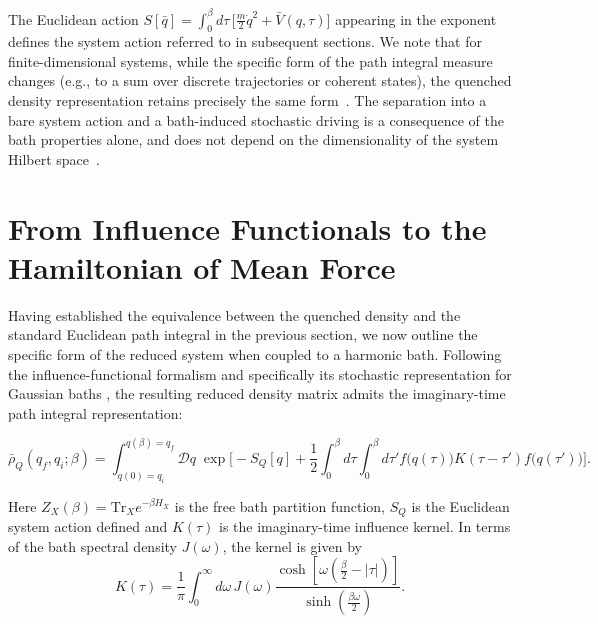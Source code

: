 \documentclass[aps,prl,twocolumn,superscriptaddress,showpacs,floatfix]{revtex4-2}
\newcommand{\Tr}{\mathrm{Tr}}
\begin{document}
The Euclidean action $S[\bar q]=\int_0^\beta d\tau\,\big[\frac{m}{2}\dot q^2+\bar V(q,\tau)\big]$
appearing in the exponent defines the system action referred to in subsequent
sections. We note that for finite-dimensional systems, while the specific form of the path integral measure changes (e.g., to a sum over discrete trajectories or coherent states), the quenched density representation retains precisely the same form~\cite{weissQuantumDissipativeSystems2012, altlandCondensedMatterField2010}. The separation into a bare system action and a bath-induced stochastic driving is a consequence of the bath properties alone, and does not depend on the dimensionality of the system Hilbert space~\cite{leggettDynamicsDissipativeTwostate1987}.
 \section{\label{sec:influence_to_hmf}From Influence Functionals to the Hamiltonian of Mean Force}
Having established the equivalence between the quenched density and the standard Euclidean path integral in the previous section, we now outline the specific form of the reduced system when coupled to a harmonic bath. Following the influence-functional formalism \cite{feynmanTheoryGeneralQuantum1963a,caldeiraQuantumTunnellingDissipative1983a,grabertQuantumBrownianMotion1988} and specifically its stochastic representation for Gaussian baths \cite{mccaulPartitionfreeApproachOpen2017c, mccaulDrivingSpinbosonModels2018a, mccaulHowWinFriends2021b}, the resulting reduced density matrix admits the imaginary-time path integral representation:
\begin{widetext}
\begin{equation}
    \bar\rho_Q(q_f,q_i;\beta) = \int_{q(0)=q_i}^{q(\beta)=q_f}\!\!\mathcal D q\; \exp\Bigg[ -S_Q[q] + \frac{1}{2}\int_0^\beta d\tau\int_0^\beta d\tau' f\big(q(\tau)\big) K(\tau-\tau') f\big(q(\tau')\big) \Bigg].
    \label{eq:reduced_effective_PI}
\end{equation}
\end{widetext}
Here $Z_X(\beta)=\Tr_X e^{-\beta H_X}$ is the free bath partition function, $S_Q$ is the Euclidean system action defined and $K(\tau)$ is the imaginary-time influence kernel. In terms of the bath spectral density $J(\omega)$, the kernel is given by~\cite{weissQuantumDissipativeSystems2012, feynmanTheoryGeneralQuantum1963a}
\begin{equation}
    K(\tau) = \frac{1}{\pi}\int_0^\infty d\omega\, J(\omega) \frac{\cosh\!\left[\omega\left(\frac{\beta}{2}-|\tau|\right)\right]} {\sinh\!\left(\frac{\beta\omega}{2}\right)}.
    \label{eq:kernel_spectral}
\end{equation}
\end{document}
